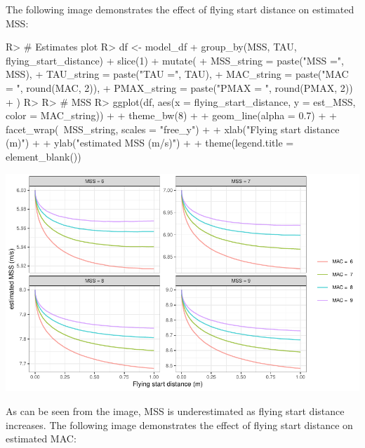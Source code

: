 \documentclass[
]{jss}
\begin{document}
The following image demonstrates the effect of flying start distance on estimated MSS:

\begin{CodeChunk}
\begin{CodeInput}
R> # Estimates plot
R> df <- model_df %
+   group_by(MSS, TAU, flying_start_distance) %
+   slice(1) %
+   mutate(
+     MSS_string = paste("MSS =", MSS),
+     TAU_string = paste("TAU =", TAU),
+     MAC_string = paste("MAC = ", round(MAC, 2)),
+     PMAX_string = paste("PMAX = ", round(PMAX, 2))
+   )
R> 
R> # MSS
R> ggplot(df, aes(x = flying_start_distance, y = est_MSS, color = MAC_string)) +
+   theme_bw(8) +
+   geom_line(alpha = 0.7) +
+   facet_wrap(~MSS_string, scales = "free_y") +
+   xlab("Flying start distance (m)") +
+   ylab("estimated MSS (m/s)") +
+   theme(legend.title = element_blank())
\end{CodeInput}


\begin{center}\includegraphics[width=1\linewidth]{paper_files/figure-latex/unnamed-chunk-27-1} \end{center}

\end{CodeChunk}

As can be seen from the image, MSS is underestimated as flying start distance increases. The following image demonstrates the effect of flying start distance on estimated MAC:
\end{document}
